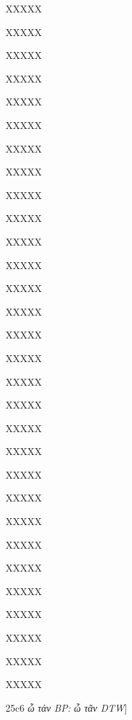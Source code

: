 \documentclass[11pt,a4paper]{book}
\begin{document}
\begin{greek}
\numberpstarttrue
\resumenumbering

\pstart{}XXXXX\pend

\pstart{}XXXXX\pend

\pstart{}XXXXX\pend

\pstart{}XXXXX\pend

\pstart{}XXXXX\pend

\pstart{}XXXXX\pend

\pstart{}XXXXX\pend

\pstart{}XXXXX\pend

\pstart{}XXXXX\pend

\pstart{}XXXXX\pend

\pstart{}XXXXX\pend

\pstart{}XXXXX\pend

\pstart{}XXXXX\pend

\pstart{}XXXXX\pend

\pstart{}XXXXX\pend

\pstart{}XXXXX\pend

\pstart{}XXXXX\pend

\pstart{}XXXXX\pend

\pstart{}XXXXX\pend

\pstart{}XXXXX\pend

\pstart{}XXXXX\pend

\pstart{}XXXXX\pend

\pstart{}XXXXX\pend

\pstart{}XXXXX\pend

\pstart{}XXXXX\pend

\pstart{}XXXXX\pend

\pstart{}XXXXX\pend

\pstart{}XXXXX\pend

\pstart{}XXXXX\pend

\pstart{}XXXXX\pend

\pstart
25c6 \textit{ὦ τάν BP: ὦ τᾶν DTW}] %
\pend


\end{greek}
\end{document}
